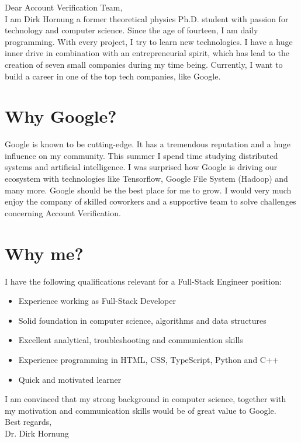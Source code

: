 \documentclass[11pt]{article}
\begin{document}
\noindent Dear Account Verification Team, \\

\noindent I am Dirk Hornung a former theoretical physics Ph.D. student with 
passion for technology and computer science. Since the age of fourteen, I am
daily programming. With every project, I try to learn new
technologies. I have a huge inner drive in combination with an entrepreneurial
spirit, which has lead to the creation of seven small companies during my time
being. Currently, I want to build a career in one of the top tech companies,
like Google.

\section*{Why Google?}
Google is known to be cutting-edge. It has a tremendous reputation and a huge
influence on my community. This summer I spend time studying distributed
systems and artificial intelligence. I was surprised how Google is driving our
ecosystem with technologies like Tensorflow, Google File System (Hadoop) and
many more. Google should be the best place for me to grow. I would very much
enjoy the company of skilled coworkers and a supportive team to solve
challenges concerning Account Verification.

\section*{Why me?}
I have the following qualifications relevant for a Full-Stack Engineer position:
\begin{itemize}
  \item Experience working as Full-Stack Developer
  \item Solid foundation in computer science, algorithms and data structures
  \item Excellent analytical, troubleshooting and communication skills
  \item Experience programming in HTML, CSS, TypeScript, Python and C++
  \item Quick and motivated learner
\end{itemize}

\noindent I am convinced that my strong background in computer science, together
with my motivation and communication skills would be of great value to Google.\\

\noindent Best regards,\\
Dr. Dirk Hornung \\

 
\end{document}
